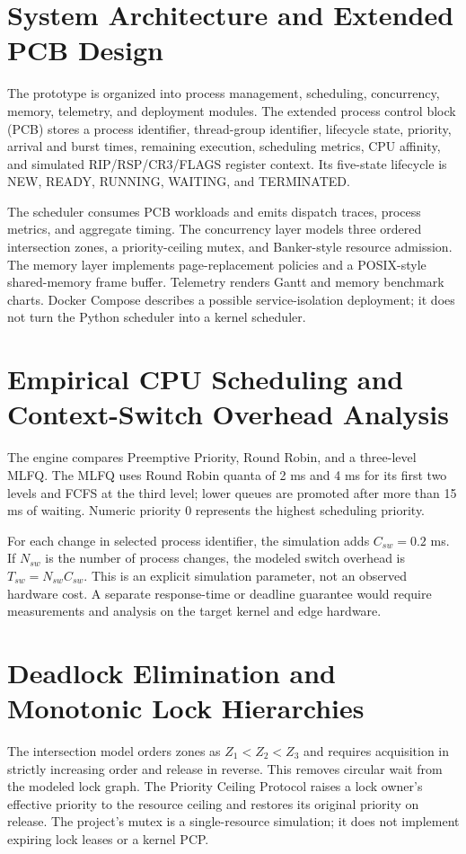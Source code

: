 \documentclass[conference]{IEEEtran}
\begin{document}
\section{System Architecture and Extended PCB Design}
The prototype is organized into process management, scheduling, concurrency,
memory, telemetry, and deployment modules. The extended process control block
(PCB) stores a process identifier, thread-group identifier, lifecycle state,
priority, arrival and burst times, remaining execution, scheduling metrics,
CPU affinity, and simulated RIP/RSP/CR3/FLAGS register context. Its five-state
lifecycle is NEW, READY, RUNNING, WAITING, and TERMINATED.

The scheduler consumes PCB workloads and emits dispatch traces, process
metrics, and aggregate timing. The concurrency layer models three ordered
intersection zones, a priority-ceiling mutex, and Banker-style resource
admission. The memory layer implements page-replacement policies and a
POSIX-style shared-memory frame buffer. Telemetry renders Gantt and memory
benchmark charts. Docker Compose describes a possible service-isolation
deployment; it does not turn the Python scheduler into a kernel scheduler.

\section{Empirical CPU Scheduling and Context-Switch Overhead Analysis}
The engine compares Preemptive Priority, Round Robin, and a three-level MLFQ.
The MLFQ uses Round Robin quanta of 2 ms and 4 ms for its first two levels and
FCFS at the third level; lower queues are promoted after more than 15 ms of
waiting. Numeric priority 0 represents the highest scheduling priority.

For each change in selected process identifier, the simulation adds
$C_{sw}=0.2$ ms. If $N_{sw}$ is the number of process changes, the modeled
switch overhead is $T_{sw}=N_{sw}C_{sw}$. This is an explicit simulation
parameter, not an observed hardware cost. A separate response-time or
deadline guarantee would require measurements and analysis on the target
kernel and edge hardware.

\section{Deadlock Elimination and Monotonic Lock Hierarchies}
The intersection model orders zones as $Z_1<Z_2<Z_3$ and requires acquisition
in strictly increasing order and release in reverse. This removes circular
wait from the modeled lock graph. The Priority Ceiling Protocol raises a
lock owner's effective priority to the resource ceiling and restores its
original priority on release. The project's mutex is a single-resource
simulation; it does not implement expiring lock leases or a kernel PCP.
\end{document}
